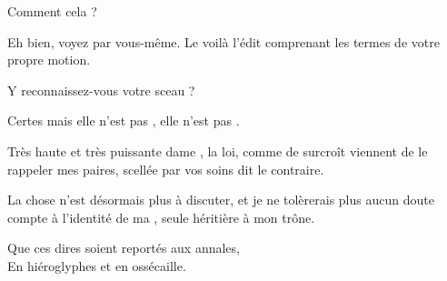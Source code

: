 \begin{drama}
  \reinespeaks Comment cela ?

  \nobleOnespeaks Eh bien, voyez par vous-même. Le voilà l’édit comprenant les termes de votre propre motion.

  \nobleTwospeaks Y reconnaissez-vous votre sceau ?

  \reinespeaks Certes mais elle n’est pas \princesse, elle n’est pas \princesse.

  \nobleOnespeaks Très haute et très puissante dame \reine, la loi, comme de surcroît viennent de le rappeler mes paires, scellée par vos soins dit le contraire.

  \roispeaks La chose n’est désormais plus à discuter, et je ne tolèrerais plus  aucun doute compte à l’identité de ma \princesse, seule héritière à mon trône.

  \begin{minipage}[t]{\linewidth}
    Que ces dires soient reportés aux annales,\\
    En hiéroglyphes et en ossécaille.
  \end{minipage}
\end{drama}


\scene

\StageDirII{\elena, \alexas}

